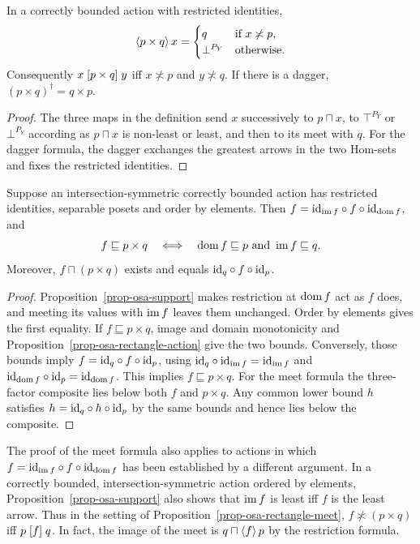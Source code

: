\begin{prop}\label{prop-osa-rectangle-action}
In a correctly bounded action with restricted identities,
\[
 \left\langle p\times q\right\rangle x=
 \begin{cases}
 q & \text{if }x\not\asymp p,\\
 \bot^{P_Y} & \text{otherwise}.
 \end{cases}
\]
Consequently $x\mathrel{\left[p\times q\right]}y$ iff $x\nasymp p$ and $y\nasymp q$.
If there is a dagger, $(p\times q)^\dagger=q\times p$.
\end{prop}

\begin{proof}
The three maps in the definition send $x$ successively to $p\sqcap x$,
to $\top^{P_Y}$ or $\bot^{P_Y}$ according as $p\sqcap x$ is non-least
or least, and then to its meet with $q$. For the dagger formula,
the dagger exchanges the greatest arrows in the two Hom-sets and
fixes the restricted identities.
\end{proof}

\begin{prop}\label{prop-osa-rectangle-meet}
Suppose an intersection-symmetric correctly bounded action has
restricted identities, separable posets and order by elements.
Then $f={\operatorname{id}}_{\operatorname{im} f}\circ f\circ{\operatorname{id}}_{\operatorname{dom} f}$, and
\[
 f\sqsubseteq p\times q
 \quad\Longleftrightarrow\quad
 \operatorname{dom} f\sqsubseteq p\ \text{and}\ \operatorname{im} f\sqsubseteq q .
\]
Moreover, $f\sqcap(p\times q)$ exists and equals
${\operatorname{id}}_q\circ f\circ{\operatorname{id}}_p$.
\end{prop}

\begin{proof}
Proposition~\ref{prop-osa-support} makes restriction at $\operatorname{dom} f$
act as $f$ does, and meeting its values with $\operatorname{im} f$ leaves them
unchanged. Order by elements gives the first equality.
If $f\sqsubseteq p\times q$, image and domain monotonicity and
Proposition~\ref{prop-osa-rectangle-action} give the two bounds.
Conversely, those bounds imply $f={\operatorname{id}}_q\circ f\circ{\operatorname{id}}_p$,
using ${\operatorname{id}}_q\circ{\operatorname{id}}_{\operatorname{im} f}={\operatorname{id}}_{\operatorname{im} f}$ and
${\operatorname{id}}_{\operatorname{dom} f}\circ{\operatorname{id}}_p={\operatorname{id}}_{\operatorname{dom} f}$. This implies
$f\sqsubseteq p\times q$. For the meet formula the three-factor
composite lies below both $f$ and $p\times q$. Any common lower
bound $h$ satisfies $h={\operatorname{id}}_q\circ h\circ{\operatorname{id}}_p$ by the same bounds
and hence lies below the composite.
\end{proof}

The proof of the meet formula also applies to actions in which
$f={\operatorname{id}}_{\operatorname{im} f}\circ f\circ{\operatorname{id}}_{\operatorname{dom} f}$ has been established by a
different argument. In a correctly bounded, intersection-symmetric
action ordered by elements, Proposition~\ref{prop-osa-support} also
shows that $\operatorname{im} f$ is least iff $f$ is the least arrow. Thus in the
setting of Proposition~\ref{prop-osa-rectangle-meet},
$f\nasymp(p\times q)$ iff $p\mathrel{\left[f\right]}q$. In fact, the image of the
meet is $q\sqcap\left\langle f\right\rangle p$ by the restriction formula.

